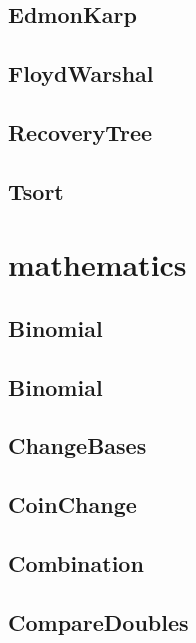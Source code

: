 \subsection{ EdmonKarp}
\raggedbottom
\hrulefill
\subsection{ FloydWarshal}
\raggedbottom
\hrulefill
\subsection{ RecoveryTree}
\raggedbottom
\hrulefill
\subsection{ Tsort}
\raggedbottom
\hrulefill

\section{mathematics}
\subsection{ Binomial}
\raggedbottom
\hrulefill
\subsection{ Binomial}
\raggedbottom
\hrulefill
\subsection{ ChangeBases}
\raggedbottom
\hrulefill
\subsection{ CoinChange}
\raggedbottom
\hrulefill
\subsection{ Combination}
\raggedbottom
\hrulefill
\subsection{ CompareDoubles}
\raggedbottom
\hrulefill
